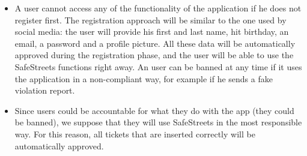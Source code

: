 \begin{itemize}
    \item A user cannot access any of the functionality of the application if he does not register first.
        The registration approach will be similar to the one used by social media: the user will provide his first and last name, hit birthday, an email, a password and a profile picture.
        All these data will be automatically approved during the registration phase, and the user will be able to use the SafeStreets functions right away.
        An user can be banned at any time if it uses the application in a non-compliant way, for example if he sends a fake violation report.
    \item Since users could be accountable for what they do with the app (they could be banned), we suppose that they will use SafeStreets
        in the most responsible way. For this reason, all tickets that are inserted correctly will be automatically approved.
\end{itemize}